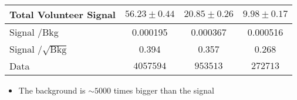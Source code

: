 \begin{frame}
\begin{table}[htbp]
\begin{tabular}{|p{3.5cm}|c|c|c|}
			Total Volunteer Signal & $56.23\pm0.44$ & $20.85\pm0.26$ & $9.98\pm0.17$ \\\hline
			Signal \textsubscript{\HWW}/Bkg & 0.000195 & 0.000367 & 0.000516 \\
			Signal \textsubscript{\HWW}/$\sqrt{\text{Bkg}}$ & 0.394 & 0.357 & 0.268 \\\hline
			\rowcolor{mygray}
			Data & $4057594$ & $953513$ & $272713$ \\\hline
		\end{tabular}
	\end{table}
	\begin{itemize}
		\item The background is $\sim5000$ times bigger than the signal
	\end{itemize}
\end{frame}